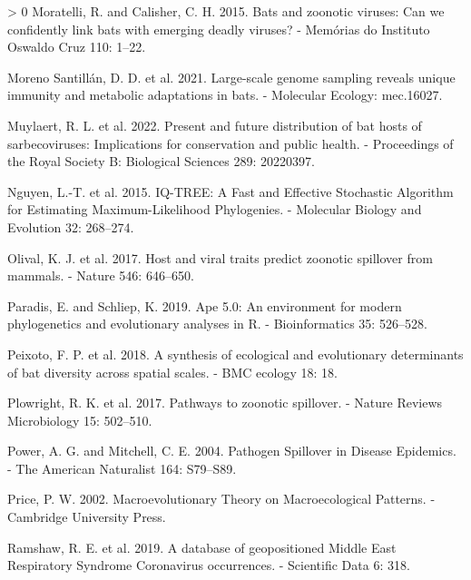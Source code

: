 \documentclass[11pt]{article}
\newlength{\cslhangindent}
\newenvironment{CSLReferences}[3] %
 {%
  \setlength{\parindent}{0pt}
  \ifodd #1 \everypar{\setlength{\hangindent}{\cslhangindent}}\ignorespaces\fi
  \ifnum #2 > 0
  \setlength{\parskip}{#2\baselineskip}
  \fi
 }%
 {}
\begin{document}
\begin{CSLReferences}{1}{0}
\leavevmode\hypertarget{ref-Moratelli2015BatZoo}{}%
Moratelli, R. and Calisher, C. H. 2015. Bats and zoonotic viruses: Can
we confidently link bats with emerging deadly viruses? - Memórias do
Instituto Oswaldo Cruz 110: 1--22.

\leavevmode\hypertarget{ref-MorenoSantillan2021LarGen}{}%
Moreno Santillán, D. D. et al. 2021. Large-scale genome sampling reveals
unique immunity and metabolic adaptations in bats. - Molecular Ecology:
mec.16027.

\leavevmode\hypertarget{ref-Muylaert2022PreFut}{}%
Muylaert, R. L. et al. 2022. Present and future distribution of bat
hosts of sarbecoviruses: Implications for conservation and public
health. - Proceedings of the Royal Society B: Biological Sciences 289:
20220397.

\leavevmode\hypertarget{ref-Nguyen2015IqtFas}{}%
Nguyen, L.-T. et al. 2015. IQ-TREE: A Fast and Effective Stochastic
Algorithm for Estimating Maximum-Likelihood Phylogenies. - Molecular
Biology and Evolution 32: 268--274.

\leavevmode\hypertarget{ref-Olival2017HosVir}{}%
Olival, K. J. et al. 2017. Host and viral traits predict zoonotic
spillover from mammals. - Nature 546: 646--650.

\leavevmode\hypertarget{ref-Paradis2019ApeEnv}{}%
Paradis, E. and Schliep, K. 2019. Ape 5.0: An environment for modern
phylogenetics and evolutionary analyses in R. - Bioinformatics 35:
526--528.

\leavevmode\hypertarget{ref-Peixoto2018SynEco}{}%
Peixoto, F. P. et al. 2018. A synthesis of ecological and evolutionary
determinants of bat diversity across spatial scales. - BMC ecology 18:
18.

\leavevmode\hypertarget{ref-Plowright2017PatZoo}{}%
Plowright, R. K. et al. 2017. Pathways to zoonotic spillover. - Nature
Reviews Microbiology 15: 502--510.

\leavevmode\hypertarget{ref-Power2004PatSpi}{}%
Power, A. G. and Mitchell, C. E. 2004. Pathogen Spillover in Disease
Epidemics. - The American Naturalist 164: S79--S89.

\leavevmode\hypertarget{ref-Price2002MacThe}{}%
Price, P. W. 2002. Macroevolutionary Theory on Macroecological Patterns.
- Cambridge University Press.

\leavevmode\hypertarget{ref-Ramshaw2019DatGeo}{}%
Ramshaw, R. E. et al. 2019. A database of geopositioned Middle East
Respiratory Syndrome Coronavirus occurrences. - Scientific Data 6: 318.


\end{CSLReferences}
\end{document}
